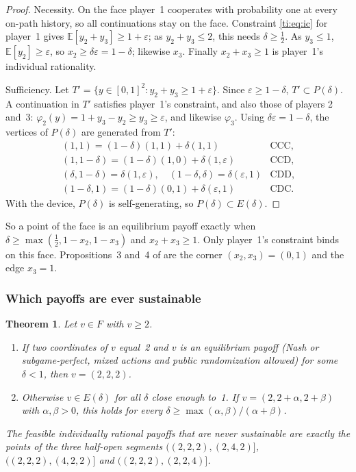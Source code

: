 \documentclass[11pt]{amsart}
\newtheorem{theorem}{Theorem}[section]
\theoremstyle{remark}
\begin{document}
\begin{proof}
Necessity. On the face player~1 cooperates with probability one at every on-path history, so all
continuations stay on the face. Constraint \eqref{ti:eq:ic} for player~1 gives
$\mathbb E[y_2+y_3]\ge1+\varepsilon$; as $y_2+y_3\le2$, this needs $\delta\ge\frac12$. As $y_3\le1$,
$\mathbb E[y_2]\ge\varepsilon$, so $x_2\ge\delta\varepsilon=1-\delta$; likewise $x_3$. Finally
$x_2+x_3\ge1$ is player~1's individual rationality.

Sufficiency. Let $T'=\{y\in[0,1]^2: y_2+y_3\ge1+\varepsilon\}$. Since $\varepsilon\ge1-\delta$,
$T'\subset P(\delta)$. A continuation in $T'$ satisfies player~1's constraint, and also those of
players 2 and~3: $\varphi_2(y)=1+y_3-y_2\ge y_3\ge\varepsilon$, and likewise $\varphi_3$. Using
$\delta\varepsilon=1-\delta$, the vertices of $P(\delta)$ are generated from $T'$:
\[
\begin{array}{ll}
(1,1)=(1-\delta)(1,1)+\delta(1,1) & \text{CCC},\\
(1,1-\delta)=(1-\delta)(1,0)+\delta(1,\varepsilon) & \text{CCD},\\
(\delta,1-\delta)=\delta(1,\varepsilon),\quad (1-\delta,\delta)=\delta(\varepsilon,1) & \text{CDD},\\
(1-\delta,1)=(1-\delta)(0,1)+\delta(\varepsilon,1) & \text{CDC}.
\end{array}
\]
With the device, $P(\delta)$ is self-generating, so $P(\delta)\subset E(\delta)$.
\end{proof}

So a point of the face is an equilibrium payoff exactly when $\delta\ge\max(\frac12,1-x_2,1-x_3)$
and $x_2+x_3\ge1$. Only player~1's constraint binds on this face. Propositions~3
and~4 of \cite{v1} are the corner $(x_2,x_3)=(0,1)$ and the edge $x_3=1$.

\subsubsection{Which payoffs are ever sustainable}

\begin{theorem}\label{ti:thm:R3}
Let $v\in F$ with $v\ge2$.
\begin{enumerate}
\item If two coordinates of $v$ equal~2 and $v$ is an equilibrium payoff (Nash or subgame-perfect,
  mixed actions and public randomization allowed) for some $\delta<1$, then $v=(2,2,2)$.
\item Otherwise $v\in E(\delta)$ for all $\delta$ close enough to~1. If $v=(2,2+\alpha,2+\beta)$ with
  $\alpha,\beta>0$, this holds for every $\delta\ge\max(\alpha,\beta)/(\alpha+\beta)$.
\end{enumerate}
The feasible individually rational payoffs that are never sustainable are exactly the points of
the three half-open segments $((2,2,2),(2,4,2)]$, $((2,2,2),(4,2,2)]$ and
$((2,2,2),(2,2,4)]$.
\end{theorem}
\end{document}
